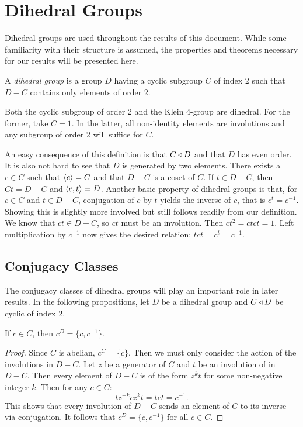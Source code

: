 \documentclass[main.tex]{subfiles}
\begin{document}
\section{Dihedral Groups}

Dihedral groups are used throughout the results of this document. While some familiarity with their structure is assumed, the properties and theorems necessary for our results will be presented here.

\begin{definition}
A \emph{dihedral group} is a group $D$ having a cyclic subgroup $C$ of index 2 such that $D - C$ contains only elements of order 2.
\end{definition}

\begin{remark}
Both the cyclic subgroup of order 2 and the Klein 4-group are dihedral. For the former, take $C = 1$. In the latter, all non-identity elements are involutions and any subgroup of order 2 will suffice for $C$.
\end{remark}

An easy consequence of this definition is that $C \triangleleft D$ and that $D$ has even order. It is also not hard to see that $D$ is generated by two elements. There exists a $c \in C$ such that $\langle c \rangle = C$ and that $D - C$ is a coset of $C$. If $t \in D - C$, then $Ct = D - C$ and $\langle c,t \rangle = D$.  Another basic property of dihedral groups is that, for $c \in C$ and $t \in D - C$, conjugation of $c$ by $t$ yields the inverse of $c$, that is $c^t = c^{-1}$. Showing this is slightly more involved but still follows readily from our definition. We know that $ct \in D - C$, so $ct$ must be an involution. Then $ct^2 = ctct = 1$. Left multiplication by $c^{-1}$ now gives the desired relation: $tct = c^t = c^{-1}$.


\subsection{Conjugacy Classes}

The conjugacy classes of dihedral groups will play an important role in later results. In the following propositions, let $D$ be a dihedral group and $C \triangleleft D$ be cyclic of index 2.

\begin{proposition}
If $c \in C$, then $c^D = \{c, c^{-1}\}$.
\end{proposition}

\begin{proof}
Since $C$ is abelian, $c^C = \{c\}$. Then we must only consider the action of the involutions in $D - C$. Let $z$ be a generator of $C$ and $t$ be an involution of in $D - C$. Then every element of $D - C$ is of the form $z^k t$ for some non-negative integer $k$. Then for any $c \in C$:
$$t z^{-k} c z^k t = t c t = c^{-1} \text{.}$$
This shows that every involution of $D - C$ sends an element of $C$ to its inverse via conjugation. It follows that $c^D = \{c, c^{-1}\}$ for all $c \in C$.
\end{proof}
\end{document}

